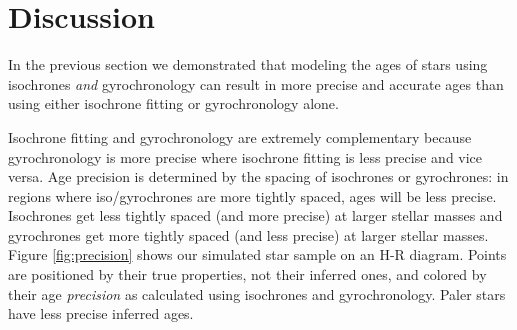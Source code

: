 \section{Discussion}
\label{section:discussion}






In the previous section we demonstrated that modeling the ages of stars using
isochrones {\it and} gyrochronology can result in more precise and accurate
ages than using either isochrone fitting or gyrochronology alone.

Isochrone fitting and gyrochronology are extremely complementary because
gyrochronology is more precise where isochrone fitting is less precise and
vice versa.
Age precision is determined by the spacing of isochrones or gyrochrones: in
regions where iso/gyrochrones are more tightly spaced, ages will be less
precise.
Isochrones get less tightly spaced (and more precise) at larger stellar masses
and gyrochrones get more tightly spaced (and less precise) at larger stellar
masses.
Figure \ref{fig:precision} shows our simulated star sample on an H-R diagram.
Points are positioned by their true properties, not their inferred ones, and
colored by their age {\it precision} as calculated using isochrones and
gyrochronology.
Paler stars have less precise inferred ages.

